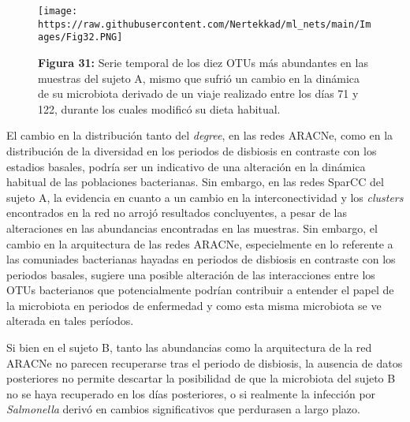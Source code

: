 \documentclass[
]{book}
\begin{document}
\begin{figure}
\centering
\texttt{[image: https://raw.githubusercontent.com/Nertekkad/ml\_nets/main/Images/Fig32.PNG]}
\caption{\textbf{Figura 31:} Serie temporal de los diez OTUs más abundantes en las muestras del sujeto A, mismo que sufrió un cambio en la dinámica de su microbiota derivado de un viaje realizado entre los días 71 y 122, durante los cuales modificó su dieta habitual.}
\end{figure}

El cambio en la distribución tanto del \emph{degree}, en las redes ARACNe, como en la distribución de la diversidad en los periodos de disbiosis en contraste con los estadios basales, podría ser un indicativo de una alteración en la dinámica habitual de las poblaciones bacterianas. Sin embargo, en las redes SparCC del sujeto A, la evidencia en cuanto a un cambio en la interconectividad y los \emph{clusters} encontrados en la red no arrojó resultados concluyentes, a pesar de las alteraciones en las abundancias encontradas en las muestras. Sin embargo, el cambio en la arquitectura de las redes ARACNe, especielmente en lo referente a las comuniades bacterianas hayadas en periodos de disbiosis en contraste con los periodos basales, sugiere una posible alteración de las interacciones entre los OTUs bacterianos que potencialmente podrían contribuir a entender el papel de la microbiota en periodos de enfermedad y como esta misma microbiota se ve alterada en tales períodos.

Si bien en el sujeto B, tanto las abundancias como la arquitectura de la red ARACNe no parecen recuperarse tras el periodo de disbiosis, la ausencia de datos posteriores no permite descartar la posibilidad de que la microbiota del sujeto B no se haya recuperado en los días posteriores, o si realmente la infección por \emph{Salmonella} derivó en cambios significativos que perdurasen a largo plazo.
\end{document}
